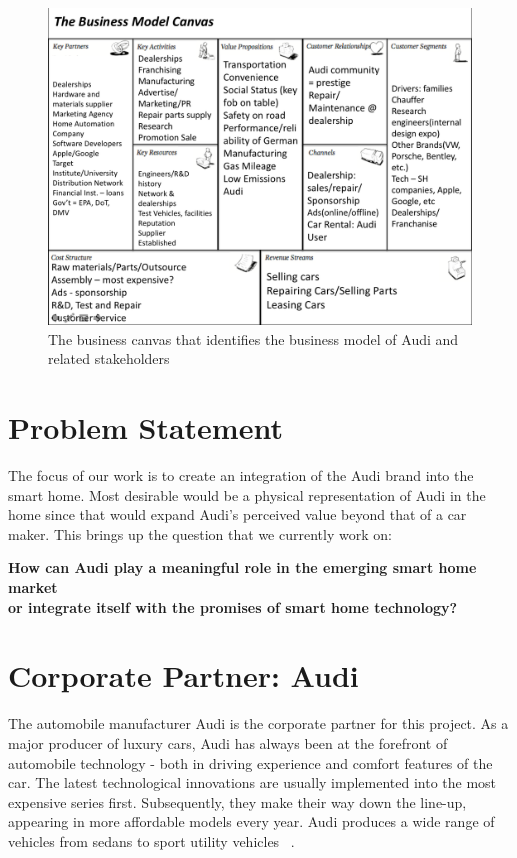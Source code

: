 \begin{figure}[ht]
	\centering
	\includegraphics[width=5.9in]{Figures/ChapterContext/canvas.png}
	\caption{The business canvas that identifies the business model of Audi and related stakeholders}
	\label{fig:canvas}
\end{figure}

\section{Problem Statement}

The focus of our work is to create an integration of the Audi brand into the smart home. Most desirable would be a physical representation of Audi in the home since that would expand Audi's perceived value beyond that of a car maker. This brings up the question that we currently work on:

\begin{center}
\textbf{How can Audi play a meaningful role in the emerging smart home market\\or integrate itself with the promises of smart home technology?}
\end{center}

\section{Corporate Partner: Audi}
\label{subsec:audi}

The automobile manufacturer Audi is the corporate partner for this project. As a major producer of luxury cars, Audi has always been at the forefront of automobile technology -  both in driving experience and comfort features of the car. The latest technological innovations are usually implemented into the most expensive series first. Subsequently, they make their way down the line-up, appearing in more affordable models every year. Audi produces a wide range of vehicles from sedans to sport utility vehicles ~\cite{Audi2014Winter}.

